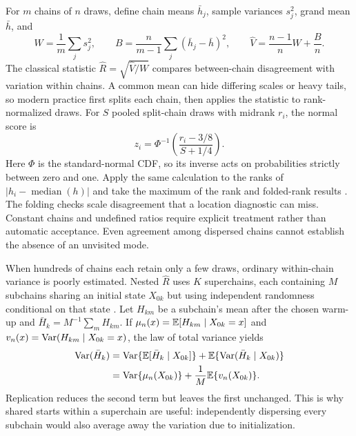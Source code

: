 For $m$ chains of $n$ draws, define chain means $\bar h_j$, sample
variances $s_j^2$, grand mean $\bar h$, and
\begin{equation}
 W=\frac1m\sum_j s_j^2,\qquad
 B=\frac{n}{m-1}\sum_j(\bar h_j-\bar h)^2,\qquad
 \widehat V=\frac{n-1}{n}W+\frac{B}{n}.
 \label{eq:bf-modern-rhat-components}
\end{equation}
The classical statistic $\widehat R=\sqrt{\widehat V/W}$ compares
between-chain disagreement with variation within chains. A common mean can
hide differing scales or heavy tails, so modern practice first splits each
chain, then applies the statistic to rank-normalized draws. For $S$ pooled
split-chain draws with midrank $r_i$, the normal score is
\begin{equation}
 z_i=\Phi^{-1}\!\left(\frac{r_i-3/8}{S+1/4}\right).
\label{eq:bf-modern-rank-transform}
\end{equation}
Here $\Phi$ is the standard-normal CDF, so its inverse acts on probabilities
strictly between zero and one. Apply the same calculation to the ranks of
$|h_i-\operatorname{median}(h)|$ and take the maximum of the rank and
folded-rank results \citep{vehtari2021rank}. The folding checks scale
disagreement that a location diagnostic can miss. Constant chains and
undefined ratios require explicit treatment rather than automatic acceptance.
Even agreement among dispersed chains cannot establish the absence of an
unvisited mode.

When hundreds of chains each retain only a few draws, ordinary within-chain
variance is poorly estimated. Nested $\widehat R$ uses $K$ superchains,
each containing $M$ subchains sharing an initial state $X_{0k}$ but using
independent randomness conditional on that state
\citep[Definition 2.2 and Theorem 3.1]{margossian2024nested}.
Let $H_{km}$ be a subchain's mean after the chosen warm-up and
$\bar H_k=M^{-1}\sum_m H_{km}$. If
$\mu_n(x)=\mathbb{E}[H_{km}\mid X_{0k}=x]$ and
$v_n(x)=\operatorname{Var}(H_{km}\mid X_{0k}=x)$, the law of total variance yields
\begin{align}
 \operatorname{Var}(\bar H_k)
 &=\operatorname{Var}\{\mathbb{E}[\bar H_k\mid X_{0k}]\}
       +\mathbb{E}\{\operatorname{Var}(\bar H_k\mid X_{0k})\}\\
 &=\operatorname{Var}\{\mu_n(X_{0k})\}
       +\frac1M\mathbb{E}\{v_n(X_{0k})\}.
 \label{eq:bf-modern-nested-decomposition}
\end{align}
Replication reduces the second term but leaves the first unchanged. This is
why shared starts within a superchain are useful: independently dispersing
every subchain would also average away the variation due to initialization.

